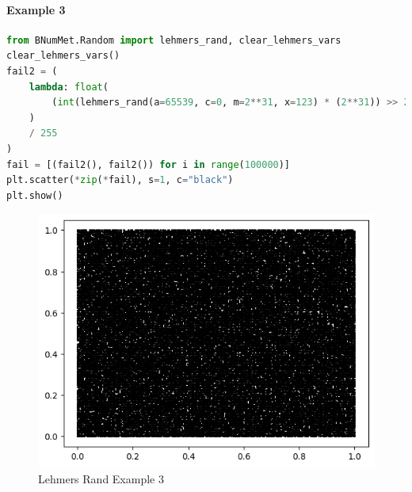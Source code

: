\paragraph{Example 3}{
\begin{lstlisting}[language=Python]
from BNumMet.Random import lehmers_rand, clear_lehmers_vars
clear_lehmers_vars()
fail2 = (
    lambda: float(
        (int(lehmers_rand(a=65539, c=0, m=2**31, x=123) * (2**31)) >> 23) & 0xFF
    )
    / 255
)
fail = [(fail2(), fail2()) for i in range(100000)]
plt.scatter(*zip(*fail), s=1, c="black")
plt.show()
\end{lstlisting}
\begin{figure}[H]
    \centering
    \includegraphics{Include/Images/Thesis/Documentation/Randomness/Lehmers Rand Example 3.png}
    \caption{Lehmers Rand Example 3}
    \label{fig:Lehmers Rand Example 3}
\end{figure}
}
